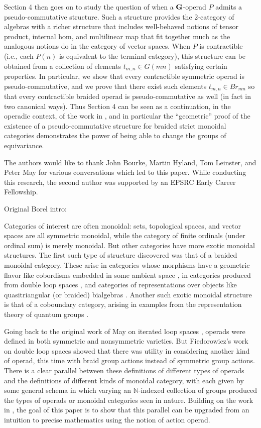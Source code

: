 Section 4 then goes on to study the question of when a $\mathbf{G}$-operad $P$ admits a pseudo-commutative structure.  Such a structure provides the 2-category of algebras with a richer structure that includes well-behaved notions of tensor product, internal hom, and multilinear map that fit together much as the analogous notions do in the category of vector spaces.  When $P$ is contractible (i.e., each $P(n)$ is equivalent to the terminal category), this structure can be obtained from a collection of elements $t_{m,n} \in G(mn)$ satisfying certain properties.  In particular, we show that every contractible symmetric operad is pseudo-commutative, and we prove that there exist such elements $t_{m,n} \in Br_{mn}$ so that every contractible braided operad is pseudo-commutative as well (in fact in two canonical ways).  Thus Section 4 can be seen as a continuation, in the operadic context, of the work in \cite{HP}, and in particular the ``geometric'' proof of the existence of a pseudo-commutative structure for braided strict monoidal categories demonstrates the power of being able to change the groups of equivariance.

The authors would like to thank John Bourke, Martin Hyland, Tom Leinster, and Peter May for various conversations which led to this paper.  While conducting this research, the second author was supported by an EPSRC Early Career Fellowship. 

Original Borel intro:


Categories of interest are often monoidal: sets, topological spaces, and vector spaces are all symmetric monoidal, while the category of finite ordinals (under ordinal sum) is merely monoidal.  But other categories have more exotic monoidal structures.  The first such type of structure discovered was that of a braided monoidal category.  These arise in categories whose morphisms have a geometric flavor like cobordisms embedded in some ambient space \cite{js}, in  categories produced from double loop spaces \cite{fie-br}, and categories of representations over objects like quasitriangular (or braided) bialgebras \cite{street-quantum} .  Another such exotic monoidal structure is that of a coboundary category, arising in examples from the representation theory of quantum groups \cite{drin-quasihopf}.

Going back to the original work of May on iterated loop spaces \cite{maygeom}, operads were defined in both symmetric and nonsymmetric varieties.  But Fiedorowicz's work on double loop spaces \cite{fie-br} showed that there was utility in considering another kind of operad, this time with braid group actions instead of symmetric group actions.  There is a clear parallel between these definitions of different types of operads and the definitions of different kinds of monoidal category, with each given by some general schema in which varying an $\mathbb{N}$-indexed collection of groups produced the types of operads or monoidal categories seen in nature.  Building on the work in \cite{cg}, the goal of this paper is to show that this parallel can be upgraded from an intuition to precise mathematics using the notion of action operad.

